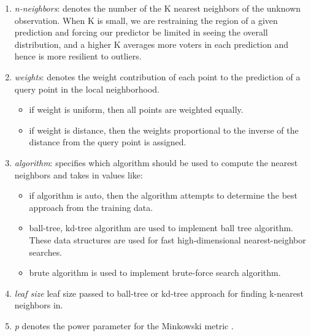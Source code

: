 \begin{enumerate}

\item \textit{n-neighbors}: denotes the number of the  K nearest neighbors of the unknown observation. When K is small, we are restraining the region of a given prediction and forcing our predictor be limited in seeing the overall distribution, and a higher K averages more voters in each prediction and hence is more resilient to outliers.  
\item \textit{weights}: denotes the weight contribution of each point to the prediction of a query point in the local neighborhood.  
\begin{itemize}

\item if weight is uniform, then all points are weighted  equally.
\item if weight is distance, then the weights proportional to the inverse of the distance from the query point is assigned.  
\end{itemize}
\item \textit{algorithm}: specifies which algorithm  should be used to compute the nearest neighbors and takes in values like:
\begin{itemize}

\item if algorithm is auto, then the algorithm attempts to determine the best approach from the training data.

\item ball-tree, kd-tree algorithm are used to implement ball tree algorithm. These data structures are used for fast high-dimensional nearest-neighbor searches.  
\item brute algorithm is used to implement brute-force search algorithm. 
\end{itemize}
\item \textit{leaf size} leaf size passed to ball-tree or kd-tree approach for finding k-nearest neighbors in.

\item \textit{p} denotes the power parameter for the Minkowski metric \citep{pedregosa2011scikit}.
\end{enumerate}

